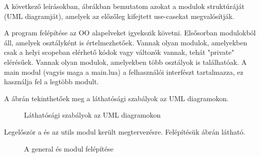 \pagebreak

A következő leírásokban, ábrákban bemutatom azokat a modulok struktúráját\\(UML diagramját), amelyek az előzőleg kifejtett use-casekat megvalósítják.

A program felépítése az OO alapelveket igyekszik követni. Elsősorban modulokból áll, amelyek osztályként is értelmezhetőek. Vannak olyan modulok, amelyekben csak a helyi scopeban elérhető kódok vagy változók vannak, tehát "private" elérésűek. Vannak olyan modulok, amelyekben több osztályok is találhatóak. A main modul (vagyis maga a main.lua) a felhasználói interfészt tartalmazza, ez használja fel a legtöbb modult.

A  ábrán tekinthetőek meg a láthatósági szabályok az UML diagramokon.
\begin{figure}[h!]
	\centering
	\caption{Láthatósági szabályok az UML diagramokon}
	\label{fig:visibilityrules}
\end{figure}


Legelőször a  és az utils modul került megtervezésre. Felépítésük  ábrán látható.

\begin{figure}[h!]
	\centering
	\caption{A general és  modul felépítése}
	\label{fig:generalandaptpackages}
\end{figure}

